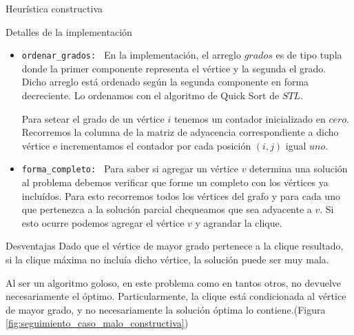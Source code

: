 \begin{section}{Heurística constructiva}
\begin{subsection}{Detalles de la implementación}
			\begin{itemize}
				\item \texttt{ordenar\_grados: } En la implementación, el arreglo $grados$ es de tipo tupla donde la primer componente representa el vértice y la segunda el grado. Dicho arreglo está ordenado según la segunda componente en forma decreciente. Lo ordenamos con el algoritmo de Quick Sort de $STL$.
				
				Para setear el grado de un vértice $i$ tenemos un contador inicializado en $cero$. Recorremos la columna de la matriz de adyacencia correspondiente a dicho vértice e incrementamos el contador por cada posición $(i,j)$ igual $uno$.
				\item \texttt{forma\_completo: } Para saber si agregar un vértice $v$ determina una solución al problema debemos verificar que forme un completo con los vértices ya incluídos. Para esto recorremos todos los vértices del grafo y para cada uno que pertenezca a la solución parcial chequeamos que sea adyacente a $v$. Si esto ocurre podemos agregar el vértice $v$ y agrandar la clique.
			\end{itemize}
		\end{subsection}
		\begin{subsection}{Desventajas }
			Dado que el vértice de mayor grado pertenece a la clique resultado, si la clique máxima no incluía dicho vértice, la solución puede ser muy mala.
			
			Al ser un algoritmo goloso, en este problema como en tantos otros, no devuelve necesariamente el óptimo. Particularmente, la clique está condicionada al vértice de mayor grado, y no necesariamente la solución óptima lo contiene.(Figura \ref{fig:seguimiento_caso_malo_constructiva})


\end{subsection}
\end{section}
